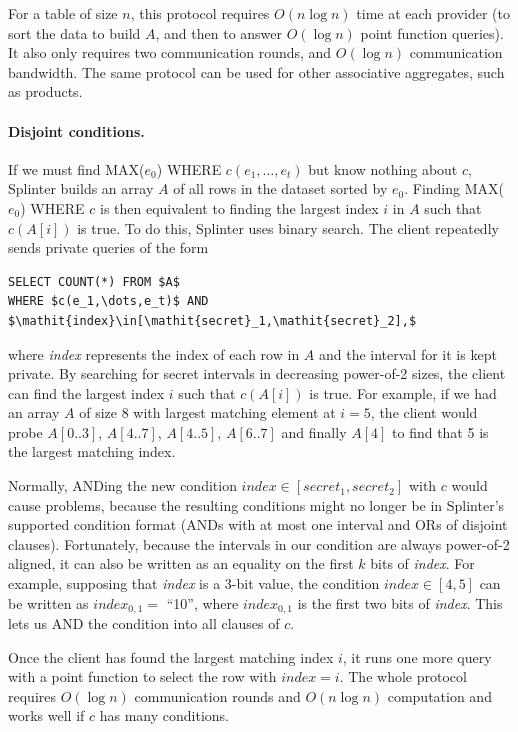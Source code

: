 For a table of size $n$, this protocol requires $O(n \log n)$ time at each provider
(to sort the data to build $A$, and then to answer $O(\log n)$ point function queries).
It also only requires two communication rounds, and $O(\log n)$ communication bandwidth.
The same protocol can be used for other associative aggregates, such as products.

\paragraph{Disjoint conditions.}
If we must find MAX($e_0$) WHERE $c(e_1,\dots,e_t)$ but know nothing about $c$,
Splinter builds an array $A$ of all rows in the dataset sorted by $e_0$.
Finding MAX($e_0$) WHERE $c$ is then equivalent to finding the largest index $i$
in $A$ such that $c(A[i])$ is true.
To do this, Splinter uses binary search.
The client repeatedly sends private queries of the form
\begin{Verbatim}[commandchars=\\\{\},codes={\catcode`$=3\catcode`_=8}]
SELECT COUNT(*) FROM $A$
WHERE $c(e_1,\dots,e_t)$ AND $\mathit{index}\in[\mathit{secret}_1,\mathit{secret}_2],$
\end{Verbatim}
where \textit{index} represents the index of each row in $A$ and the interval for it is kept
private. 
By searching for secret intervals in decreasing power-of-2 sizes, the client can find the
largest index $i$ such that $c(A[i])$ is true.
For example, if we had an array $A$ of size 8 with largest matching element at $i=5$,
the client would probe $A[0..3]$, $A[4..7]$, $A[4..5]$, $A[6..7]$ and finally $A[4]$ to
find that 5 is the largest matching index.

Normally, ANDing the new condition $\mathit{index}\in[\mathit{secret}_1,\mathit{secret}_2]$
with $c$ would cause problems, because the resulting conditions might no longer be in
Splinter's supported condition format (ANDs with at most one interval and ORs of
disjoint clauses).
Fortunately, because the intervals in our condition are always power-of-2 aligned,
it can also be written as an equality on the first $k$ bits of \emph{index}.
For example, supposing that \emph{index} is a 3-bit value, the condition
$\mathit{index} \in [4,5]$ can be written as $\mathit{index}_{0,1} =$ ``10'', where
$\mathit{index}_{0,1}$ is the first two bits of \emph{index}.
This lets us AND the condition into all clauses of $c$.

Once the client has found the largest matching index $i$, it runs one
more query with a point function to select the row with $index = i$.
The whole protocol requires $O(\log n)$ communication rounds
and $O(n \log n)$ computation and works well if $c$ has many conditions. 

